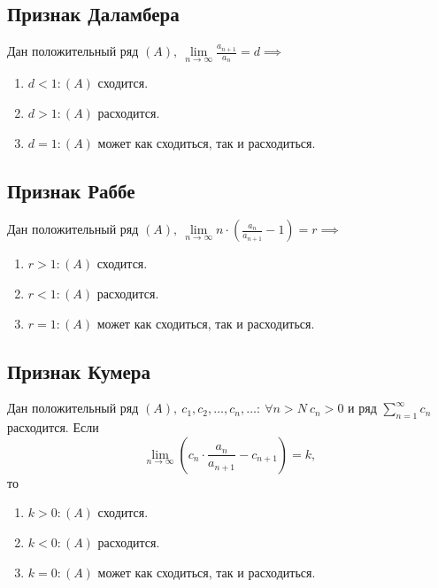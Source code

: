 \subsection{Признак Даламбера}

\begin{theorem}
    Дан положительный ряд $(A), \ \underset{n\rightarrow\infty}{\lim}\frac{a_{n+1}}{a_n} = d \implies $
    \begin{enumerate}
        \item $d < 1:(A)$ сходится.
        \item $d > 1:(A)$ расходится.
        \item $d = 1:(A)$ может как сходиться, так и расходиться.
    \end{enumerate}
\end{theorem}

\newpage

\subsection{Признак Раббе}

\begin{theorem}
    Дан положительный ряд $(A), \ \underset{n\rightarrow\infty}{\lim}n \cdot \left(\frac{a_n}{a_{n+1}} - 1\right) = r \implies $
    \begin{enumerate}
        \item $r>1: (A)$ сходится.
        \item $r<1: (A)$ расходится.
        \item $r=1: (A)$ может как сходиться, так и расходиться.
    \end{enumerate}
\end{theorem}

\subsection{Признак Кумера}

\begin{theorem}
    Дан положительный ряд $(A), \ c_1,c_2,\ldots,c_n,\ldots: \ \forall n > N \ c_n > 0$ и ряд $\sum_{n=1}^{\infty}c_n$ расходится. Если
    \[
        \underset{n\rightarrow\infty}{\lim}\left(c_n \cdot \frac{a_n}{a_{n+1}} - c_{n+1}\right) = k,
    \]
    то
    \begin{enumerate}
        \item $k > 0: (A)$ сходится.
        \item $k < 0: (A)$ расходится.
        \item $k = 0: (A)$ может как сходиться, так и расходиться.
    \end{enumerate}
\end{theorem}

